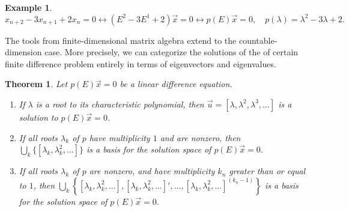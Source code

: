 \documentclass[12pt]{article}
\theoremstyle{plain}
\newtheorem{theorem}{Theorem}
\theoremstyle{definition}
\newtheorem*{example}{Example}
\theoremstyle{remark}
\numberwithin{equation}{section}  %
\begin{document}
\begin{example}
\begin{equation*}
x_{n+2} - 3x_{n+1} + 2x_{n} = 0 \longleftrightarrow (E^2 - 3E^1 + 2)\vec{x} = 0
\longleftrightarrow p(E) \vec{x} = 0, \quad p(\lambda) = \lambda^2 - 3 \lambda
+2.
\end{equation*}
\end{example}
The tools from finite-dimensional matrix algebra extend to the
countable-dimension case. More precisely, we can categorize the solutions of the
of certain finite difference problem entirely in terms of eigenvectors and
eigenvalues.
\begin{theorem}
\label{thm:dif-eq}
Let $p(E) \vec{x} = 0$ be a linear difference equation. 
\begin{enumerate}
  \item 
If $\lambda$ is a root
to its characteristic polynomial, then $\vec{u} = [\lambda, \lambda^2,
\lambda^3, \ldots]$ is a solution to $p(E) \vec{x} = 0$. 
  \item 
If all roots $\lambda_k$ of $p$ have multiplicity $1$ and are nonzero, then
$ \bigcup_k \{ [\lambda_k, \lambda_k^2, \ldots] \}$ is  
a basis for the solution space of $p(E) \vec{x} = 0$.	
\item If all roots $\lambda_k$ of $p$ are nonzero, and have multiplicity $k_n$
greater than or equal to $1$, then $\bigcup_k \left\{ [\lambda_k, \lambda_k^2,
\ldots], [\lambda_k, \lambda_k^2, \ldots]', \ldots, [\lambda_k, \lambda_k^2,
\ldots ]^{(k_n -1)} \right\}$ is a basis for the solution space of $p(E)
\vec{x} = 0$.
\end{enumerate}
\end{theorem}
\end{document}
